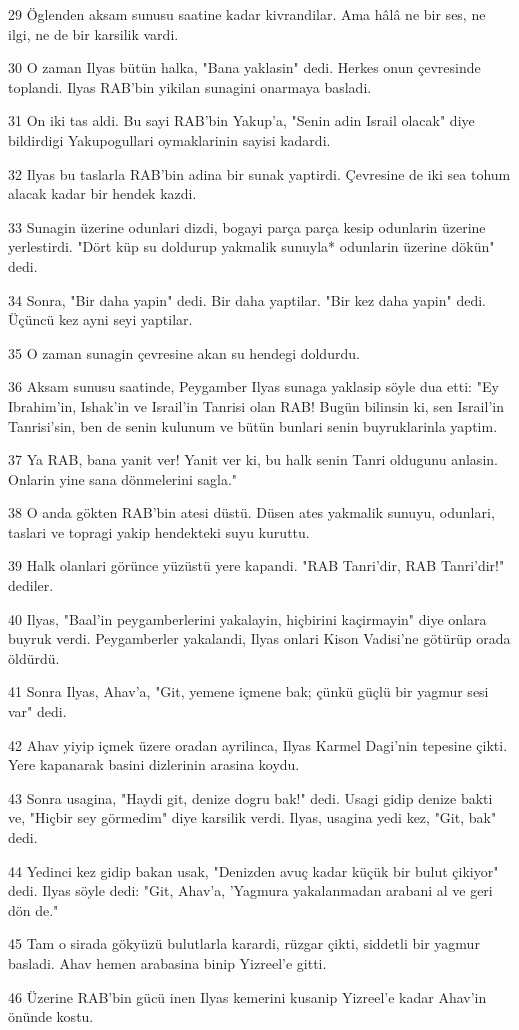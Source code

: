 \par 29 Öglenden aksam sunusu saatine kadar kivrandilar. Ama hâlâ ne bir ses, ne ilgi, ne de bir karsilik vardi.
\par 30 O zaman Ilyas bütün halka, "Bana yaklasin" dedi. Herkes onun çevresinde toplandi. Ilyas RAB'bin yikilan sunagini onarmaya basladi.
\par 31 On iki tas aldi. Bu sayi RAB'bin Yakup'a, "Senin adin Israil olacak" diye bildirdigi Yakupogullari oymaklarinin sayisi kadardi.
\par 32 Ilyas bu taslarla RAB'bin adina bir sunak yaptirdi. Çevresine de iki sea tohum alacak kadar bir hendek kazdi.
\par 33 Sunagin üzerine odunlari dizdi, bogayi parça parça kesip odunlarin üzerine yerlestirdi. "Dört küp su doldurup yakmalik sunuyla* odunlarin üzerine dökün" dedi.
\par 34 Sonra, "Bir daha yapin" dedi. Bir daha yaptilar. "Bir kez daha yapin" dedi. Üçüncü kez ayni seyi yaptilar.
\par 35 O zaman sunagin çevresine akan su hendegi doldurdu.
\par 36 Aksam sunusu saatinde, Peygamber Ilyas sunaga yaklasip söyle dua etti: "Ey Ibrahim'in, Ishak'in ve Israil'in Tanrisi olan RAB! Bugün bilinsin ki, sen Israil'in Tanrisi'sin, ben de senin kulunum ve bütün bunlari senin buyruklarinla yaptim.
\par 37 Ya RAB, bana yanit ver! Yanit ver ki, bu halk senin Tanri oldugunu anlasin. Onlarin yine sana dönmelerini sagla."
\par 38 O anda gökten RAB'bin atesi düstü. Düsen ates yakmalik sunuyu, odunlari, taslari ve topragi yakip hendekteki suyu kuruttu.
\par 39 Halk olanlari görünce yüzüstü yere kapandi. "RAB Tanri'dir, RAB Tanri'dir!" dediler.
\par 40 Ilyas, "Baal'in peygamberlerini yakalayin, hiçbirini kaçirmayin" diye onlara buyruk verdi. Peygamberler yakalandi, Ilyas onlari Kison Vadisi'ne götürüp orada öldürdü.
\par 41 Sonra Ilyas, Ahav'a, "Git, yemene içmene bak; çünkü güçlü bir yagmur sesi var" dedi.
\par 42 Ahav yiyip içmek üzere oradan ayrilinca, Ilyas Karmel Dagi'nin tepesine çikti. Yere kapanarak basini dizlerinin arasina koydu.
\par 43 Sonra usagina, "Haydi git, denize dogru bak!" dedi. Usagi gidip denize bakti ve, "Hiçbir sey görmedim" diye karsilik verdi. Ilyas, usagina yedi kez, "Git, bak" dedi.
\par 44 Yedinci kez gidip bakan usak, "Denizden avuç kadar küçük bir bulut çikiyor" dedi. Ilyas söyle dedi: "Git, Ahav'a, 'Yagmura yakalanmadan arabani al ve geri dön de."
\par 45 Tam o sirada gökyüzü bulutlarla karardi, rüzgar çikti, siddetli bir yagmur basladi. Ahav hemen arabasina binip Yizreel'e gitti.
\par 46 Üzerine RAB'bin gücü inen Ilyas kemerini kusanip Yizreel'e kadar Ahav'in önünde kostu.

